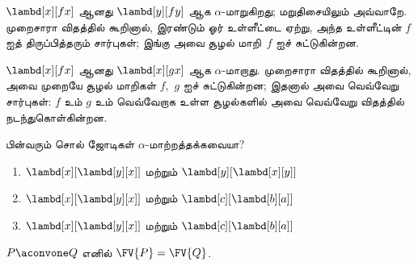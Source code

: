 \documentclass[../../../include/open-logic-section]{subfiles}
\begin{document}
\begin{ex}
  $\lambd[x][f x]$ ஆனது $\lambd[y][f y]$ ஆக $\alpha$-மாறுகிறது; மறுதிசையிலும்
  அவ்வாறே. முறைசாரா விதத்தில் கூறினால், இரண்டும் ஓர் உள்ளீட்டை ஏற்று, அந்த
  உள்ளீட்டின் $f$ ஐத் திருப்பித்தரும் சார்புகள்; இங்கு அவை சூழல் மாறி~$f$ ஐச்
  சுட்டுகின்றன.

  $\lambd[x][f x]$ ஆனது $\lambd[x][g x]$ ஆக $\alpha$-மாறாது. முறைசாரா
  விதத்தில் கூறினால், அவை முறையே சூழல் மாறிகள் $f$,~$g$ ஐச் சுட்டுகின்றன;
  இதனால் அவை வெவ்வேறு சார்புகள்: $f$ உம் $g$ உம் வெவ்வேறாக உள்ள சூழல்களில்
  அவை வெவ்வேறு விதத்தில் நடந்துகொள்கின்றன.
\end{ex}

\begin{prob}
  பின்வரும் சொல் ஜோடிகள் $\alpha$-மாற்றத்தக்கவையா?
  \begin{enumerate}
  \item $\lambd[x][\lambd[y][x]]$ மற்றும் $\lambd[y][\lambd[x][y]]$
  \item $\lambd[x][\lambd[y][x]]$ மற்றும் $\lambd[c][\lambd[b][a]]$
  \item $\lambd[x][\lambd[y][x]]$ மற்றும் $\lambd[c][\lambd[b][a]]$
  \end{enumerate}
\end{prob}

\begin{lem}
  $P \aconvone Q$ எனில் $\FV{P} = \FV{Q}$.
\end{lem}
\end{document}

